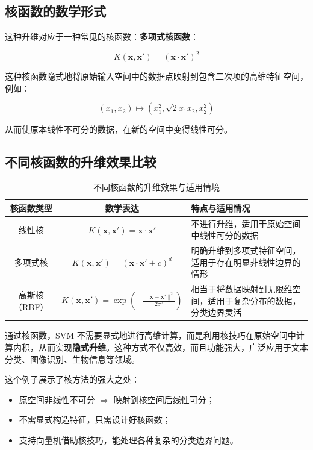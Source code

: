 \subsection{核函数的数学形式}

这种升维对应于一种常见的核函数：\textbf{多项式核函数}：

\[
K(\mathbf{x}, \mathbf{x}') = (\mathbf{x} \cdot \mathbf{x}')^2
\]

这种核函数隐式地将原始输入空间中的数据点映射到包含二次项的高维特征空间，例如：

\[
(x_1, x_2) \mapsto (x_1^2, \sqrt{2}x_1 x_2, x_2^2)
\]

从而使原本线性不可分的数据，在新的空间中变得线性可分。

\subsection{不同核函数的升维效果比较}

\begin{table}[htbp]
\centering
\caption{不同核函数的升维效果与适用情境}
\begin{tabular}{|c|c|p{7cm}|}
\hline
\textbf{核函数类型} & \textbf{数学表达} & \textbf{特点与适用情况} \\
\hline
线性核 & \( K(\mathbf{x}, \mathbf{x}') = \mathbf{x} \cdot \mathbf{x}' \) & 不进行升维，适用于原始空间中线性可分的数据 \\
\hline
多项式核 & \( K(\mathbf{x}, \mathbf{x}') = (\mathbf{x} \cdot \mathbf{x}' + c)^d \) & 明确升维到多项式特征空间，适用于存在明显非线性边界的情形 \\
\hline
高斯核（RBF） & \( K(\mathbf{x}, \mathbf{x}') = \exp\left(-\frac{\|\mathbf{x} - \mathbf{x}'\|^2}{2\sigma^2}\right) \) & 相当于将数据映射到无限维空间，适用于复杂分布的数据，分类边界灵活 \\
\hline
\end{tabular}
\label{tab:kernel_comparison}
\end{table}


通过核函数，SVM 不需要显式地进行高维计算，而是利用核技巧在原始空间中计算内积，从而实现\textbf{隐式升维}。这种方式不仅高效，而且功能强大，广泛应用于文本分类、图像识别、生物信息等领域。

这个例子展示了核方法的强大之处：
\begin{itemize}
    \item 原空间非线性不可分 $\Rightarrow$ 映射到核空间后线性可分；
    \item 不需显式构造特征，只需设计好核函数；
    \item 支持向量机借助核技巧，能处理各种复杂的分类边界问题。
\end{itemize}

